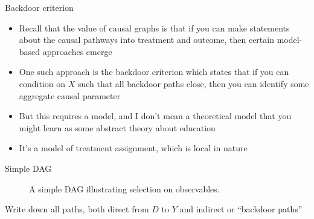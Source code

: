 \documentclass{beamer}
\begin{document}
\begin{frame}{Backdoor criterion}

\begin{itemize}

\item Recall that the value of causal graphs is that if you can make statements about the causal pathways into treatment and outcome, then certain model-based approaches emerge
\item One such approach is the backdoor criterion which states that if you can condition on $X$ such that all backdoor paths close, then you can identify some aggregate causal parameter
\item But this requires a model, and I don't mean a theoretical model that you might learn as some abstract theory about education
\item It's a model of treatment assignment, which is local in nature

\end{itemize}

\end{frame}

\begin{frame}{Simple DAG}

\begin{figure}
\begin{center}
\caption{A simple DAG illustrating selection on observables.}
\label{fig:backdoor_dag}
\end{center}
\end{figure}

\bigskip

Write down all paths, both direct from $D$ to $Y$ and indirect or ``backdoor paths'' 

\end{frame}
\end{document}

